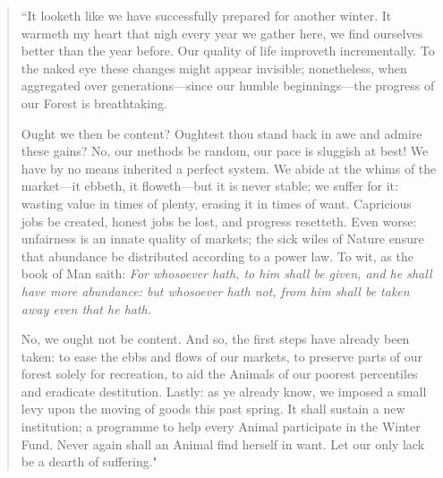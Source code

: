 \begingroup
	\fontsize{10pt}{12pt}\selectfont
		\begin{quote}

			``It looketh like we have successfully prepared for another winter.
			  It warmeth my heart that nigh every year we gather here, we find ourselves better than the year before. Our quality of life improveth incrementally.
			To the naked eye these changes might appear invisible; nonetheless, when aggregated over generations---since our humble beginnings---the progress of our Forest is breathtaking. %

			Ought we then be content? Oughtest thou stand back in awe and admire these gains?
			No, our methods be random, our pace is sluggish at best! We have by no means inherited a perfect system. We abide at the whims of the market---it ebbeth, it floweth---but it is never stable; we suffer for it: wasting value in times of plenty, erasing it in times of want. Capricious jobs be created, honest jobs be lost, and progress resetteth. Even worse: unfairness is an innate quality of markets; the sick wiles of Nature ensure that abundance be distributed according to a power law. To wit, as the book of Man saith: \textit{For whosoever hath, to him shall be given, and he shall have more abundance: but whosoever hath not, from him shall be taken away even that he hath.}

			No, we ought not be content. And so, the first steps have already been taken: to ease the ebbs and flows of our markets, to preserve parts of our forest solely for recreation, to aid the Animals of our poorest percentiles and eradicate destitution. Lastly: as ye already know, we imposed a small levy upon the moving of goods this past spring. It shall sustain a new institution; a programme to help every Animal participate in the Winter Fund. Never again shall an Animal find herself in want. Let our only lack be a dearth of suffering."
		\end{quote}
\endgroup